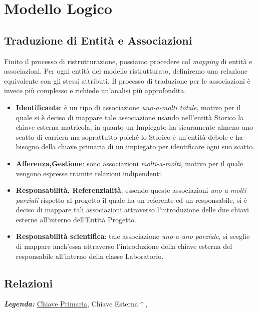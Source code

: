 \section{Modello Logico}

\subsection{Traduzione di Entità e Associazioni}

Finito il processo di ristrutturazione, possiamo procedere col \textit{mapping} di entità e associazioni. Per ogni entità del modello ristrutturato, definiremo una relazione equivalente con gli stessi attributi.
Il processo di traduzione per le associazioni è invece più complesso e richiede un'analisi più approfondita. 

\begin{itemize}
    \item \textbf{Identificante}: è un tipo di associazione \textit{uno-a-molti totale}, motivo per il quale si è deciso di mappare tale associazione usando nell'entità Storico la chiave esterna matricola, in quanto un Impiegato ha sicuramente almeno uno scatto di carriera ma soprattutto poiché lo Storico è un'entità debole e ha bisogno della chiave primaria di un impiegato per identificare ogni suo scatto.

    \item \textbf{Afferenza,Gestione}: sono associazioni \textit{molti-a-molti}, motivo per il quale vengono espresse tramite relazioni indipendenti.

    \item \textbf{Responsabilità, Referenzialità}: essendo queste associazioni \textit{uno-a-molti parziali} rispetto al progetto il quale ha un referente ed un responsabile, si è deciso di mappare tali associazioni attraverso l'introduzione delle due chiavi esterne all'interno dell'Entità Progetto.

    \item \textbf{Responsabilità scientifica}: tale associazione \textit{uno-a-uno parziale}, si sceglie di mappare anch'essa attraverso l'introduzione della chiave esterna del responsabile all'interno della classe Laboratorio.
\end{itemize}
\newpage

\subsection{Relazioni}

\textit{\textbf{Legenda:}} \underline{Chiave Primaria}, Chiave Esterna$\uparrow$, 

